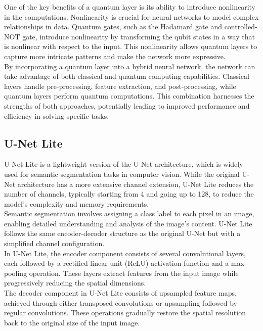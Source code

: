 \documentclass[conference]{IEEEtran}
\begin{document}
One of the key benefits of a quantum layer is its ability to introduce nonlinearity in the computations. Nonlinearity is crucial for neural networks to model complex relationships in data. Quantum gates, such as the Hadamard gate and controlled-NOT gate, introduce nonlinearity by transforming the qubit states in a way that is nonlinear with respect to the input. This nonlinearity allows quantum layers to capture more intricate patterns and make the network more expressive.\\

By incorporating a quantum layer into a hybrid neural network, the network can take advantage of both classical and quantum computing capabilities. Classical layers handle pre-processing, feature extraction, and post-processing, while quantum layers perform quantum computations. This combination harnesses the strengths of both approaches, potentially leading to improved performance and efficiency in solving specific tasks.\\

\subsection{U-Net Lite}
U-Net Lite is a lightweight version of the U-Net architecture, which is widely used for semantic segmentation tasks in computer vision. While the original U-Net architecture has a more extensive channel extension, U-Net Lite reduces the number of channels, typically starting from 4 and going up to 128, to reduce the model's complexity and memory requirements.\\

Semantic segmentation involves assigning a class label to each pixel in an image, enabling detailed understanding and analysis of the image's content. U-Net Lite follows the same encoder-decoder structure as the original U-Net but with a simplified channel configuration.\\

In U-Net Lite, the encoder component consists of several convolutional layers, each followed by a rectified linear unit (ReLU) activation function and a max-pooling operation. These layers extract features from the input image while progressively reducing the spatial dimensions.\\

The decoder component in U-Net Lite consists of upsampled feature maps, achieved through either transposed convolutions or upsampling followed by regular convolutions. These operations gradually restore the spatial resolution back to the original size of the input image.\\
\end{document}
